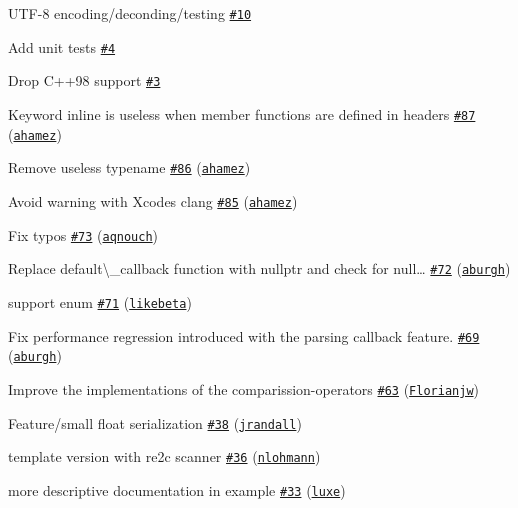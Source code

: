 \begin{DoxyItemize}
\item U\+T\+F-\/8 encoding/deconding/testing \href{https://github.com/nlohmann/json/issues/10}{\tt \#10}
\item Add unit tests \href{https://github.com/nlohmann/json/issues/4}{\tt \#4}
\item Drop C++98 support \href{https://github.com/nlohmann/json/issues/3}{\tt \#3}
\item Keyword \textquotesingle{}inline\textquotesingle{} is useless when member functions are defined in headers \href{https://github.com/nlohmann/json/pull/87}{\tt \#87} (\href{https://github.com/ahamez}{\tt ahamez})
\item Remove useless typename \href{https://github.com/nlohmann/json/pull/86}{\tt \#86} (\href{https://github.com/ahamez}{\tt ahamez})
\item Avoid warning with Xcode\textquotesingle{}s clang \href{https://github.com/nlohmann/json/pull/85}{\tt \#85} (\href{https://github.com/ahamez}{\tt ahamez})
\item Fix typos \href{https://github.com/nlohmann/json/pull/73}{\tt \#73} (\href{https://github.com/aqnouch}{\tt aqnouch})
\item Replace {\ttfamily default\textbackslash{}\+\_\+callback} function with {\ttfamily nullptr} and check for null… \href{https://github.com/nlohmann/json/pull/72}{\tt \#72} (\href{https://github.com/aburgh}{\tt aburgh})
\item support enum \href{https://github.com/nlohmann/json/pull/71}{\tt \#71} (\href{https://github.com/likebeta}{\tt likebeta})
\item Fix performance regression introduced with the parsing callback feature. \href{https://github.com/nlohmann/json/pull/69}{\tt \#69} (\href{https://github.com/aburgh}{\tt aburgh})
\item Improve the implementations of the comparission-\/operators \href{https://github.com/nlohmann/json/pull/63}{\tt \#63} (\href{https://github.com/Florianjw}{\tt Florianjw})
\item Feature/small float serialization \href{https://github.com/nlohmann/json/pull/38}{\tt \#38} (\href{https://github.com/jrandall}{\tt jrandall})
\item template version with re2c scanner \href{https://github.com/nlohmann/json/pull/36}{\tt \#36} (\href{https://github.com/nlohmann}{\tt nlohmann})
\item more descriptive documentation in example \href{https://github.com/nlohmann/json/pull/33}{\tt \#33} (\href{https://github.com/luxe}{\tt luxe})

\end{DoxyItemize}
